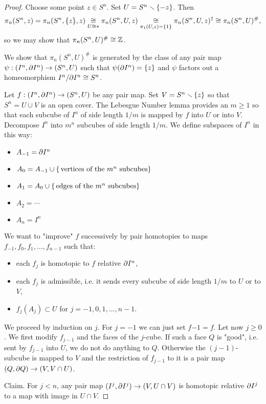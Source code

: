\begin{proof}
Choose some point $z\in S^n$. Set $U=S^n\smallsetminus\{-z\}$. Then \[\pi_n(S^n,z)=\pi_n(S^n,\{z\},z)\underset{U\cong *}{\cong}\pi_n(S^n,U,z)\underset{\pi_1(U,z)=\{1\}}{\cong}\pi_n(S^n,U,z)^\dagger\cong\pi_n(S^n,U)^\#,\]
so we may show that $\pi_n(S^n,U)^\#\cong{\mathbb Z}$.

We show that $\pi_n(S^n,U)^\#$ is generated by the class of any pair map $\psi:(I^n,\partial I^n)\to(S^n,U)$ such that $\psi(\partial I^n)=\{z\}$ and $\psi$ factors out a homeomorphism $I^n/\partial I^n\cong S^n$.

Let $f:(I^n,\partial I^n)\to(S^n,U)$ be any pair map. Set $V=S^n\smallsetminus\{z\}$ so that $S^n=U\cup V$ is an open cover. The Lebesgue Number lemma provides an $m\geq1$ so that each subcube of $I^n$ of side length $1/m$ is mapped by $f$ into $U$ or into $V$. Decompose $I^n$ into $m^n$ subcubes of side length $1/m$. We define subspaces of $I^n$ in this way:
\begin{itemize}[label=-]
    \item $A_{-1}=\partial I^n$
    \item $A_0=A_{-1}\cup\{\text{\,vertices of the }m^n\text{ subcubes}\}$
    \item $A_1=A_0\cup\{\text{\,edges of the }m^n\text{ subcubes}\}$
    \item $A_2=\cdots$
    \item $A_n=I^n$
\end{itemize}
We want to "improve" $f$ successively by pair homotopies to maps $f_{-1},f_0,f_1,\dots,f_{n-1}$ such that:
\begin{itemize}
    \item each $f_j$ is homotopic to $f$ relative $\partial I^n$,
    \item each $f_j$ is admissible, i.e. it sends every subcube of side length $1/m$ to $U$ or to $V$,
    \item $f_j(A_j)\subset U$ for $j=-1,0,1,\dots,n-1$.
\end{itemize}

We proceed by induction on $j$. For $j=-1$ we can just set $f{-1}=f$. Let now $j\geq 0$. We first modify $f_{j-1}$ and the faces of the $j$-cube. If such a face $Q$ is "good", i.e. sent by $f_{j-1}$ into $U$, we do not do anything to $Q$. Otherwise the $(j-1)$-subcube is mapped to $V$ and the restriction of $f_{j-1}$ to it is a pair map $(Q,\partial Q)\to (V,V\cap U)$.

Claim. For $j<n$, any pair map $(I^j,\partial I^j)\to (V,U\cap V)$ is homotopic relative $\partial I^j$ to a map with image in $U\cap V$.


\end{proof}
